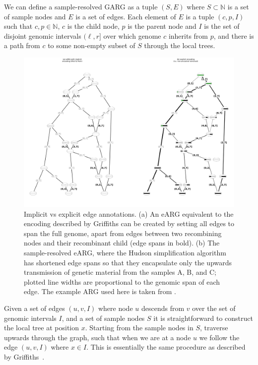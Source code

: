 \documentclass{article}
\begin{document}
We can define a sample-resolved GARG as a tuple $(S, E)$
where $S \subset \mathbb{N}$ is a set of sample nodes and
$E$ is a set of edges. Each element of $E$
is a tuple $(c, p, I)$ such that $c, p \in \mathbb{N}$,
$c$ is the child node, $p$ is the parent node and $I$ is the set of
disjoint genomic intervals $(\ell, r]$
over which genome $c$ inherits from $p$, and there is a path from
$c$ to some non-empty subset of $S$ through the local trees.

\begin{figure}
\centering
\includegraphics[width=\textwidth]{illustrations/ARG_edge_annotations}
\caption{\label{fig-ancestry-resolution}
Implicit vs explicit edge annotations. (a) An eARG equivalent to the encoding
described by Griffiths can be created by setting all edges to span the full
genome, apart from edges between two recombining nodes and their recombinant
child (edge spans in bold). (b) The sample-resolved eARG, where the Hudson
simplification algorithm has shortened edge spans so that they encapsulate only
the upwards transmission of genetic material from the samples A, B, and C;
plotted line widths are proportional to the genomic span of each edge. The
example ARG used here is taken from \citet[][fig. 1]{wiuf1999recombination}.
}
\end{figure}

Given a set of edges $(u, v, I)$ where node $u$ descends from $v$
over the set of genomic intervals $I$, and a set of sample nodes $S$
it is straightforward to construct the local tree at position $x$.
Starting from the sample nodes in $S$, traverse upwards through the
graph, such that when we are at a node $u$ we follow the edge
$(u, v, I)$ where $x \in I$. This is essentially the same procedure as
described by Griffiths~\citep{griffiths1997ancestral}.
\end{document}
